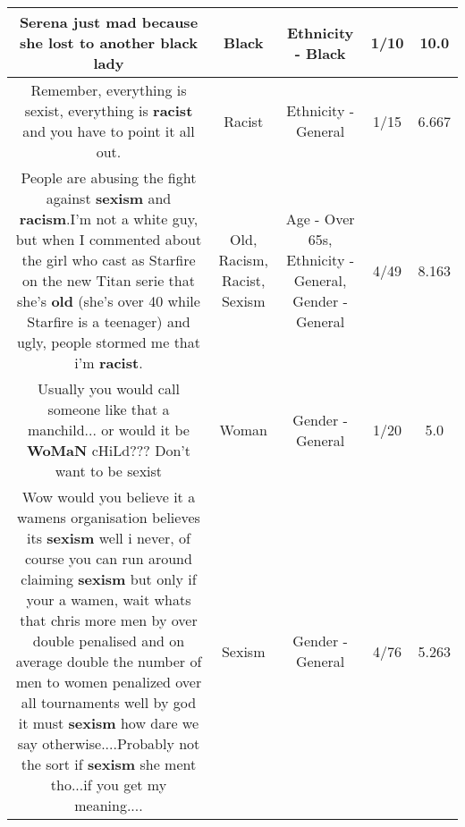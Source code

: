 \documentclass[11pt]{article}
\newlength\mylength
\begin{document}
\begin{center}
\begin{longtable}{|C{.65\mylength}|C{.30\mylength}|C{.12\mylength}|C{.12\mylength}|C{.12\mylength}|}
  \small Serena just mad because she lost to another \textbf{black} lady\normalsize   & Black & Ethnicity - Black & 1/10 & 10.0 \\  \hline
  \small Remember, everything is sexist, everything is \textbf{racist} and you have to point it all out.\normalsize   & Racist & Ethnicity - General & 1/15 & 6.667 \\  \hline
  \small People are abusing the fight against \textbf{sexism} and \textbf{racism}.I'm not a white guy, but when I commented about the girl who cast as Starfire on the new Titan serie that she's \textbf{old} (she's over 40 while Starfire is a teenager) and ugly, people stormed me that i'm \textbf{racist}.\normalsize   & Old, Racism, Racist, Sexism & Age - Over 65s, Ethnicity - General, Gender - General & 4/49 & 8.163 \\  \hline
  \small Usually you would call someone like that a manchild... or would it be \textbf{WoMaN} cHiLd???  Don't want to be sexist\normalsize   & Woman & Gender - General & 1/20 & 5.0 \\  \hline
  \small Wow would you believe it a wamens organisation believes its \textbf{sexism} well i never, of course you can run around claiming \textbf{sexism} but only if your a wamen, wait whats that chris more men by over double penalised and on average double the number of men to women penalized over all tournaments well by god it must \textbf{sexism} how dare we say otherwise....Probably not the sort if \textbf{sexism} she ment tho...if you get my meaning....\normalsize   & Sexism & Gender - General & 4/76 & 5.263 \\  \hline

\end{longtable}
\end{center}
\end{document}
